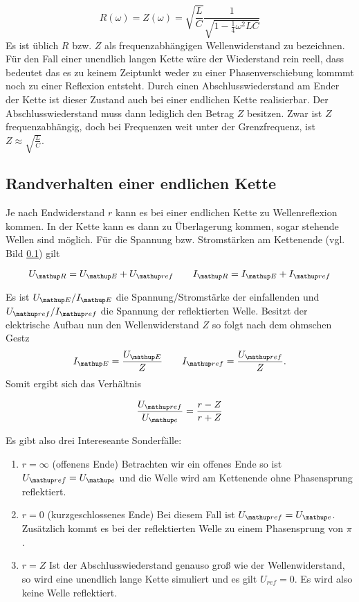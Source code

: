 \begin{equation}
R(\omega)=Z(\omega)=\sqrt{\frac{L}{C}}\frac{1}{\sqrt{1-\frac{1}{4}\omega^2LC}}
\end{equation}
Es ist üblich $R$ bzw. $Z$ als frequenzabhängigen Wellenwiderstand zu bezeichnen.
Für den Fall einer unendlich langen Kette wäre der Wiederstand rein reell, dass bedeutet 
das es zu keinem Zeiptunkt weder zu einer Phasenverschiebung kommmt noch zu einer Reflexion entsteht.
Durch einen Abschlusswiederstand am Ender der Kette ist dieser Zustand auch bei einer endlichen Kette 
realisierbar. Der Abschlusswiederstand muss dann lediglich den Betrag $Z$ besitzen.
Zwar ist $Z$ frequenzabhängig, doch bei Frequenzen weit unter der Grenzfrequenz, ist 
$Z\approx \sqrt{\frac{L}{C}}$.

\subsection{Randverhalten einer endlichen Kette}
Je nach Endwiderstand $r$ kann es bei einer endlichen Kette 
zu Wellenreflexion kommen. In der Kette kann es dann
zu Überlagerung kommen, sogar stehende Wellen sind möglich.
Für die Spannung bzw. Stromstärken am Kettenende (vgl. Bild \ref{}) gilt

\begin{equation*}
U\ua{R}=U\ua{E}+U\ua{ref} \qquad I\ua{R}=I\ua{E}+I\ua{ref}
\end{equation*}

Es ist $U\ua{E}/I\ua{E}$ die Spannung/Stromstärke der einfallenden und $U\ua{ref}/I\ua{ref}$ die Spannung der reflektierten 
Welle. Besitzt der elektrische Aufbau nun den Wellenwiderstand $Z$ so folgt nach dem
ohmschen Gestz
\begin{equation*}
I\ua{E}=\frac{U\ua{E}}{Z} \qquad I\ua{ref}=\frac{U\ua{ref}}{Z}.
\end{equation*}
Somit ergibt sich das Verhältnis

\begin{equation*}
\frac{U\ua{ref}}{U\ua{e}}=\frac{r-Z}{r+Z}
\end{equation*}

Es gibt also drei Intereseante Sonderfälle:

\renewcommand{\labelenumi}{\alph{enumi})}
\begin{enumerate}
\item{ $r=\infty$ (offenens Ende) \newline
Betrachten wir ein offenes Ende so ist $U\ua{ref}=U\ua{e}$ und die Welle wird am Kettenende ohne Phasensprung reflektiert.}
\item{ $r=0$ (kurzgeschlossenes Ende) \newline
Bei diesem Fall ist $U\ua{ref}=U\ua{e}$. Zusätzlich kommt es bei der reflektierten Welle zu einem Phasensprung von $\pi$.}
\item{ $r=Z$ \newline
Ist der Abschlusswiederstand genauso groß wie der Wellenwiderstand, so wird eine unendlich lange Kette simuliert und 
es gilt $U_{ref}=0$. Es wird also keine Welle reflektiert.}
\end{enumerate}

